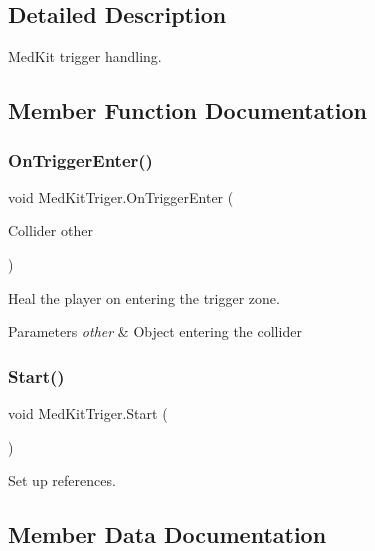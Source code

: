 \subsection{Detailed Description}
Med\+Kit trigger handling. 

\subsection{Member Function Documentation}
\mbox{\label{class_med_kit_triger_ab638fdcd755f734f6058975f651b628a}} 
\subsubsection{\texorpdfstring{OnTriggerEnter()}{OnTriggerEnter()}}
{\footnotesize\ttfamily void Med\+Kit\+Triger.\+On\+Trigger\+Enter (\begin{DoxyParamCaption}\item[{Collider}]{other }\end{DoxyParamCaption})\hspace{0.3cm}{\ttfamily [private]}}



Heal the player on entering the trigger zone. 


\begin{DoxyParams}{Parameters}
{\em other} & Object entering the collider \\
\hline
\end{DoxyParams}
\mbox{\label{class_med_kit_triger_a03597c257a8c3ee404a4e356db780b0e}} 
\subsubsection{\texorpdfstring{Start()}{Start()}}
{\footnotesize\ttfamily void Med\+Kit\+Triger.\+Start (\begin{DoxyParamCaption}{ }\end{DoxyParamCaption})\hspace{0.3cm}{\ttfamily [private]}}



Set up references. 



\subsection{Member Data Documentation}
\mbox{\label{class_med_kit_triger_aabb6415626ac4c6aef5d820442aa219a}} 
